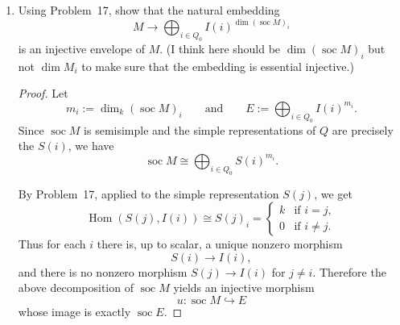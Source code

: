 \documentclass[11pt, a4paper]{article}
\begin{document}
\begin{enumerate}[leftmargin=*, label=\textbf{\arabic*.}]
\begin{proof}
    We verify that $f^\lambda$ is a morphism. Let $\alpha\colon j\to\ell$ be an arrow. For $m\in M_j$:
    \[
    f^\lambda_\ell(\psi_\alpha(m))=\sum_{\substack{q\colon \ell\to i}} \lambda\bigl(\psi_q(\psi_\alpha(m))\bigr)\cdot q
    =\sum_{\substack{q\colon \ell\to i}} \lambda\bigl(\psi_{q\alpha}(m)\bigr)\cdot q.
    \]
    On the other hand,
    \[
    I(i)_\alpha(f^\lambda_j(m))=\sum_{\substack{p\colon j\to i}} \lambda\bigl(\psi_p(m)\bigr)\cdot I(i)_\alpha(p).
    \]
    A path $p\colon j\to i$ satisfies $I(i)_\alpha(p)\neq 0$ if and only if $p$ starts with $\alpha$, i.e., $p=q\alpha$ for some path $q\colon\ell\to i$. In that case $I(i)_\alpha(q\alpha)=q$. Hence
    \[
    I(i)_\alpha(f^\lambda_j(m))=\sum_{\substack{q\colon\ell\to i}} \lambda\bigl(\psi_{q\alpha}(m)\bigr)\cdot q = f^\lambda_\ell(\psi_\alpha(m)).
    \]
    Thus $f^\lambda$ is a morphism and $\Phi(f^\lambda)=\lambda$, so $\Phi$ is surjective.
    
    \medskip\noindent\textbf{Conclusion.}
    Since all vector spaces are finite-dimensional, $M_i^*\cong M_i$ as vector spaces (non-canonically). Therefore
    \[
    \operatorname{Hom}(M,I(i))\cong M_i^*\cong M_i
    \]
    as $k$-vector spaces.
\end{proof}

\item Using Problem~17, show that the natural embedding
\[
M \longrightarrow \bigoplus_{i\in Q_0} I(i)^{\dim (\operatorname{soc}M)_i}
\]
is an injective envelope of $M$. (I think here should be $\dim (\operatorname{soc}M)_i$ but not $\dim M_i$ to make sure that the embedding is essential injective.)

\begin{proof}
    Let
    \[
    m_i:=\dim_k(\operatorname{soc}M)_i
    \qquad\text{and}\qquad
    E:=\bigoplus_{i\in Q_0} I(i)^{m_i}.
    \]
    Since $\operatorname{soc}M$ is semisimple and the simple representations of $Q$ are
    precisely the $S(i)$, we have
    \[
    \operatorname{soc}M \cong \bigoplus_{i\in Q_0} S(i)^{m_i}.
    \]
    
    By Problem~17, applied to the simple representation $S(j)$, we get
    \[
    \operatorname{Hom}(S(j),I(i)) \cong S(j)_i=
    \begin{cases}
    k & \text{if } i=j,\\
    0 & \text{if } i\neq j.
    \end{cases}
    \]
    Thus for each $i$ there is, up to scalar, a unique nonzero morphism
    \[
    S(i)\longrightarrow I(i),
    \]
    and there is no nonzero morphism $S(j)\to I(i)$ for $j\neq i$. Therefore the above
    decomposition of $\operatorname{soc}M$ yields an injective morphism
    \[
    u\colon \operatorname{soc}M \hookrightarrow E
    \]
    whose image is exactly $\operatorname{soc}E$.
    

\end{proof}
\end{enumerate}
\end{document}
